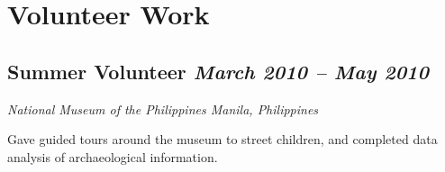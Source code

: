 \section*{Volunteer Work}

\subsection*{{\color{special-color}Summer Volunteer \hfill \textnormal{\emph{March 2010 -- May 2010}}}}
\begin{description}
  \item[\faUsers] \emph{National Museum of the Philippines \hfill {\color{gray}Manila, Philippines}}
  \item Gave guided tours around the museum to street children, and completed data analysis of archaeological information.
\end{description}